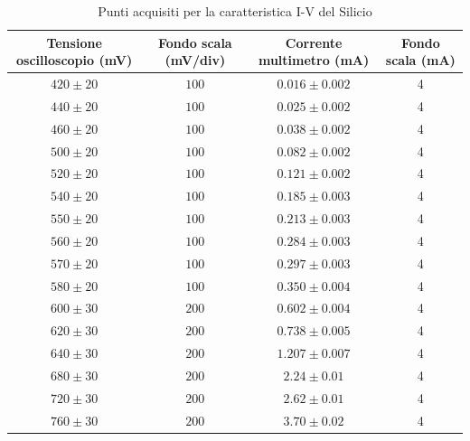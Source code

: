 \documentclass[]{article}
\begin{document}
	\begin{table}[H]
		\centering
	\begin{tabular}{|c|c|c|c|}
		\hline
		Tensione oscilloscopio (mV)& Fondo scala (mV/div) & Corrente multimetro (mA) &Fondo scala (mA)\\
		\hline
		$ 420\pm 20 $ &$ 100 $ & $ 0.016\pm 0.002 $ &4\\
		\hline
		$440\pm20 $ &$ 100 $ & $ 0.025\pm0.002 $ &4 \\
		\hline
		$ 460\pm 20 $ &$ 100 $ & $ 0.038\pm 0.002 $ &4 \\
		\hline
		$ 500\pm 20 $ &$ 100 $ & $ 0.082\pm 0.002 $ &4 \\
		\hline
		$ 520\pm 20 $ &$ 100 $ & $0.121\pm 0.002$ &4 \\
		\hline
		$ 540\pm 20 $ &$ 100 $ & $ 0.185\pm 0.003 $ &4 \\
		\hline
		$ 550\pm 20 $ &$ 100 $ & $ 0.213\pm 0.003 $ &4 \\
		\hline
		$ 560\pm 20 $ &$ 100 $ & $ 0.284\pm 0.003 $ &4 \\
		\hline
		$ 570\pm 20 $ &$ 100 $ & $ 0.297\pm 0.003 $ &4 \\
		\hline
		$ 580\pm 20 $ &$ 100 $ & $ 0.350\pm 0.004 $ &4 \\
		\hline
		$ 600\pm 30 $ &$ 200 $ & $ 0.602\pm0.004 $  &4\\
		\hline
		$ 620\pm 30 $ &$ 200 $ & $ 0.738\pm0.005 $  &4\\
		\hline
		$ 640\pm 30 $ &$ 200 $ & $ 1.207\pm0.007 $  &4\\
		\hline
		$ 680\pm 30 $ &$ 200 $ & $ 2.24\pm 0.01 $ &4 \\
		\hline
		$ 720\pm 30 $ &$ 200 $ & $ 2.62\pm 0.01 $ &4 \\
		\hline
		$ 760\pm 30 $ &$ 200 $ & $ 3.70\pm 0.02 $ &4 \\
		\hline
			\end{tabular}
		\caption{Punti acquisiti per la caratteristica I-V del Silicio}
		\label{tab:silicio}
	\end{table}
\end{document}
